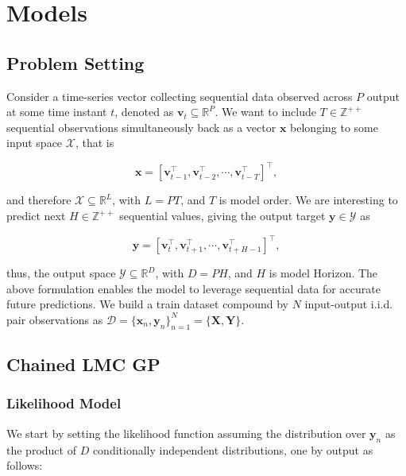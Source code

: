 \section{Models}

\subsection{Problem Setting}

Consider a time-series vector collecting sequential data observed across $P$ output at some time instant \( t \), denoted as \( \boldsymbol{v}_t \subseteq \mathbb{R}^{P}\). We want to include \( T \in \mathbb{Z}^{++} \) sequential observations simultaneously back as a vector \( \boldsymbol{x} \) belonging to some input space \( \mathcal{X} \), that is

\[
\boldsymbol{x}= [ \boldsymbol{v}_{t-1}^\top, \boldsymbol{v}_{t-2}^\top, \cdots, \boldsymbol{v}_{t-T}^\top  ]^\top,
\]

and therefore \( \boldsymbol{\mathcal{X}} \subseteq \mathbb{R}^{L} \), with \( L = PT \), and \( T \) is model order. We are interesting to predict next \( H \in \mathbb{Z}^{++} \) sequential values, giving the output target \( \boldsymbol{y} \in \boldsymbol{\mathcal{Y}} \) as

\[
\boldsymbol{y} = [ \boldsymbol{v}_{t}^\top, \boldsymbol{v}_{t+1}^\top, \cdots, \boldsymbol{v}_{t+H-1}^\top  ]^\top,
\] 

thus, the output space \( \boldsymbol{\mathcal{Y}} \subseteq \mathbb{R}^{D} \), with \( D = PH \), and \( H \) is model Horizon. The above formulation enables the model to leverage sequential data for accurate future predictions. We build a train dataset compound by \( N \) input-output i.i.d. pair observations as \( \boldsymbol{\mathcal{D}} = \{\boldsymbol{x}_n, \boldsymbol{y}_n\}_{n=1}^N = \{ \boldsymbol{X}, \boldsymbol{Y}\} \).

\subsection{Chained LMC GP}

\subsubsection{Likelihood Model}

We start by setting the likelihood function assuming the distribution over \(  \boldsymbol{y}_n \) as the product of \( D \) conditionally independent distributions, one by output as follows:

